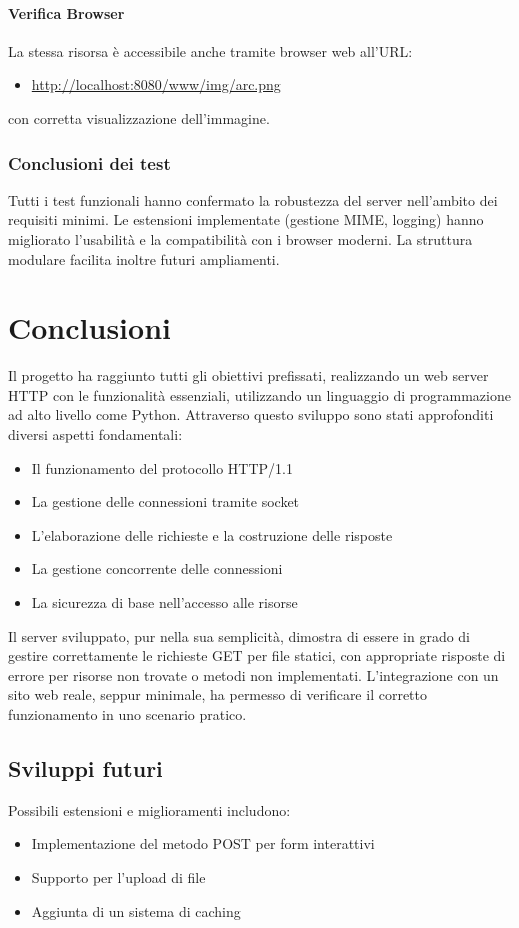 \documentclass[a4paper,12pt]{report}
\begin{document}
\subsubsection{Verifica Browser}
La stessa risorsa è accessibile anche tramite browser web all'URL:
\begin{itemize}
	\item \url{http://localhost:8080/www/img/arc.png}
\end{itemize}
con corretta visualizzazione dell'immagine.


\subsection{Conclusioni dei test}
Tutti i test funzionali hanno confermato la robustezza del server nell'ambito dei requisiti minimi. Le estensioni implementate (gestione MIME, logging)
hanno migliorato l'usabilità e la compatibilità con i browser moderni. La struttura modulare facilita inoltre futuri ampliamenti.


\chapter{Conclusioni}
Il progetto ha raggiunto tutti gli obiettivi prefissati, realizzando un web server HTTP con le funzionalità essenziali, utilizzando un
linguaggio di programmazione ad alto livello come Python. Attraverso questo sviluppo sono stati approfonditi diversi aspetti fondamentali:
\begin{itemize}
	\item Il funzionamento del protocollo HTTP/1.1
	\item La gestione delle connessioni tramite socket
	\item L'elaborazione delle richieste e la costruzione delle risposte
	\item La gestione concorrente delle connessioni
	\item La sicurezza di base nell'accesso alle risorse
\end{itemize}

Il server sviluppato, pur nella sua semplicità, dimostra di essere in grado di gestire correttamente le richieste GET per file statici, con
appropriate risposte di errore per risorse non trovate o metodi non implementati. L'integrazione con un sito web reale, seppur minimale, ha permesso di
verificare il corretto funzionamento in uno scenario pratico.

\section{Sviluppi futuri}
Possibili estensioni e miglioramenti includono:
\begin{itemize}
	\item Implementazione del metodo POST per form interattivi
	\item Supporto per l'upload di file
	\item Aggiunta di un sistema di caching
\end{itemize}
\end{document}
